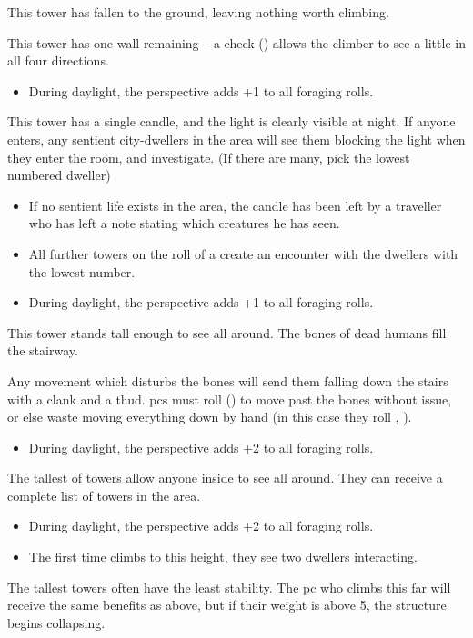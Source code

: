 \begin{multicols}{2}
\begin{dlist}
  \item
  This tower has fallen to the ground, leaving nothing worth climbing.
  \item
  This tower has one wall remaining -- a  check (\tn[8]) allows the climber to see a little in all four directions.
  \begin{itemize}
    \item
    During daylight, the perspective adds +1 to all foraging rolls.
  \end{itemize}
  \item
  This tower has a single candle, and the light is clearly visible at night.
  If anyone enters, any sentient city-dwellers in the area will see them blocking the light when they enter the room, and investigate.
  (If there are many, pick the lowest numbered dweller)
  \begin{itemize}
    \item
    If no sentient life exists in the area, the candle has been left by a traveller who has left a note stating which creatures he has seen.
    \item
    All further towers on the roll of a  create an encounter with the dwellers with the lowest number.
    \item
    During daylight, the perspective adds +1 to all foraging rolls.
  \end{itemize}
  \item
  This tower stands tall enough to see all around.
  The bones of dead humans fill the stairway.

  Any movement which disturbs the bones will send them falling down the stairs with a clank and a thud.
  \Glspl{pc} must roll  (\tn[11]) to move past the bones without issue, or else waste  moving everything down by hand (in this case they roll , \tn[7]).
  \begin{itemize}
    \item
    During daylight, the perspective adds +2 to all foraging rolls.
  \end{itemize}
  \item
  The tallest of towers allow anyone inside to see all around.
  They can receive a complete list of towers in the area.
  \begin{itemize}
    \item
    During daylight, the perspective adds +2 to all foraging rolls.
    \item
    The first time  climbs to this height, they see two dwellers interacting.
  \end{itemize}
  \item
  The tallest towers often have the least stability.
  The \gls{pc} who climbs this far will receive the same benefits as above, but if their \gls{weight} is above 5, the structure begins collapsing.


\end{dlist}
\end{multicols}
